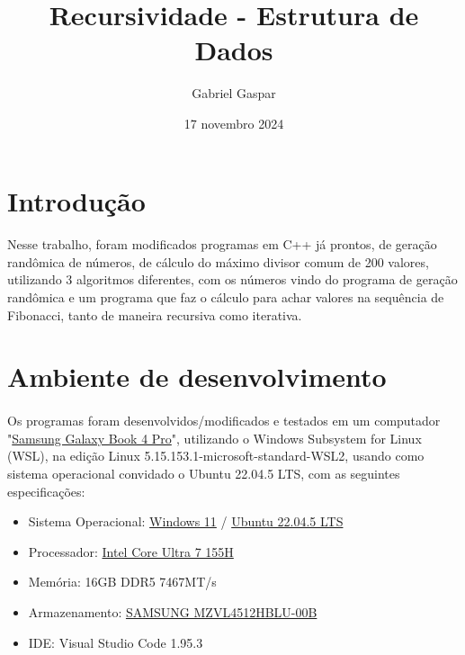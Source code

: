 \documentclass{article}
\title{Recursividade - Estrutura de Dados}
\author{Gabriel Gaspar}
\date{17 novembro 2024}
\begin{document}
\maketitle

\section{Introdução}
\paragraph{}Nesse trabalho, foram modificados programas em C++ já prontos, de geração randômica de números, de cálculo do máximo divisor comum de 200 valores, utilizando 3 algoritmos diferentes, com os números vindo do programa de geração randômica e um programa que faz o cálculo para achar valores na sequência de Fibonacci, tanto de maneira recursiva como iterativa.

\section{Ambiente de desenvolvimento}
\paragraph{} Os programas foram desenvolvidos/modificados e testados em um computador "\href{https://www.samsung.com/br/computers/samsung-book/galaxy-book4-pro-14-inch-ultra-7-16gb-512gb-np940xgk-kg1br/#specs}{Samsung Galaxy Book 4 Pro}", utilizando o Windows Subsystem for Linux (WSL), na edição Linux 5.15.153.1-microsoft-standard-WSL2, usando como sistema operacional convidado o Ubuntu 22.04.5 LTS, com as seguintes especificações:
\begin{itemize}
    \item Sistema Operacional: \href{https://www.microsoft.com/pt-br/windows}{Windows 11} / \href{https://releases.ubuntu.com/jammy/}{Ubuntu 22.04.5 LTS}
    \item Processador: \href{https://www.intel.com.br/content/www/br/pt/products/sku/236847/intel-core-ultra-7-processor-155h-24m-cache-up-to-4-80-ghz/specifications.html}{ Intel Core Ultra 7 155H}
    \item Memória: 16GB DDR5 7467MT/s
    \item Armazenamento: \href{https://www.harddrivebenchmark.net/hdd.php?hdd=SAMSUNG%20MZVL4512HBLU-00B&id=36410}{SAMSUNG MZVL4512HBLU-00B}
    \item IDE: Visual Studio Code 1.95.3
\end{itemize}
\end{document}
